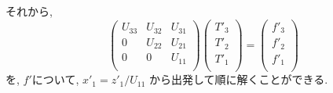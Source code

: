 それから,
%
\begin{equation}
  \left( \begin{array}{lll}
         U_{33} & U_{32} & U_{31} \\
         0      & U_{22} & U_{21} \\
         0      & 0      & U_{11} \\
         \end{array} \right)
  \left( \begin{array}{l}
         T'_3 \\ T'_2 \\ T'_1 \\
         \end{array} \right)
  = 
  \left(  \begin{array}{l}
          f'_3 \\ f'_2 \\ f'_1 \\
          \end{array} \right)
\end{equation}
%
を, $f'$について, $x'_1=z'_1/U_{11}$ から出発して順に解くことができる.

